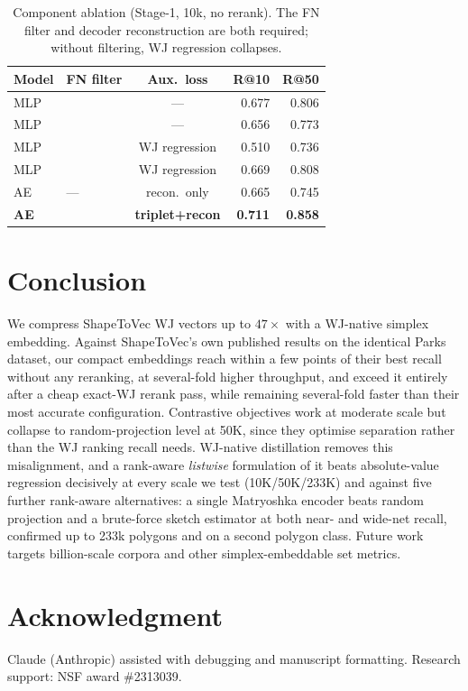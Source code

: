 \documentclass[conference]{IEEEtran}
\newcommand{\cmark}{\ding{51}}\newcommand{\xmark}{\ding{55}}
\begin{document}
\begin{table}[t]\centering
\caption{Component ablation (Stage-1, 10k, no rerank). The FN filter and decoder
reconstruction are both required; without filtering, WJ regression collapses.}
\label{tab:ablation}\small\setlength{\tabcolsep}{4pt}
\begin{tabular}{@{}llcrr@{}}
\toprule
Model & FN filter & Aux.\ loss & R@10 & R@50 \\
\midrule
MLP & \xmark & ---           & 0.677 & 0.806 \\
MLP & \cmark & ---           & 0.656 & 0.773 \\
MLP & \xmark & WJ regression & 0.510 & 0.736 \\
MLP & \cmark & WJ regression & 0.669 & 0.808 \\
AE  & ---    & recon.\ only  & 0.665 & 0.745 \\
\textbf{AE} & \cmark & \textbf{triplet+recon} & \textbf{0.711} & \textbf{0.858} \\
\bottomrule
\end{tabular}
\end{table}

\section{Conclusion}
We compress ShapeToVec WJ vectors up to $47\times$ with a WJ-native simplex embedding.
Against ShapeToVec's own published results on the identical Parks dataset, our
compact embeddings reach within a few points of their best recall without any
reranking, at several-fold higher throughput, and exceed it entirely after a cheap
exact-WJ rerank pass, while remaining several-fold faster than their most accurate
configuration. Contrastive objectives work at moderate scale but collapse to
random-projection level at 50K, since they optimise separation rather than the WJ
ranking recall needs. WJ-native distillation removes this misalignment, and a
rank-aware \emph{listwise} formulation of it beats absolute-value regression
decisively at every scale we test (10K/50K/233K) and against five further
rank-aware alternatives: a single Matryoshka encoder beats random projection and a
brute-force sketch estimator at both near- and wide-net recall, confirmed up to 233k
polygons and on a second polygon class. Future work targets billion-scale corpora and
other simplex-embeddable set metrics.

\section*{Acknowledgment}
Claude (Anthropic) assisted with debugging and manuscript formatting. 
Research support: NSF award \#2313039.



\end{document}
